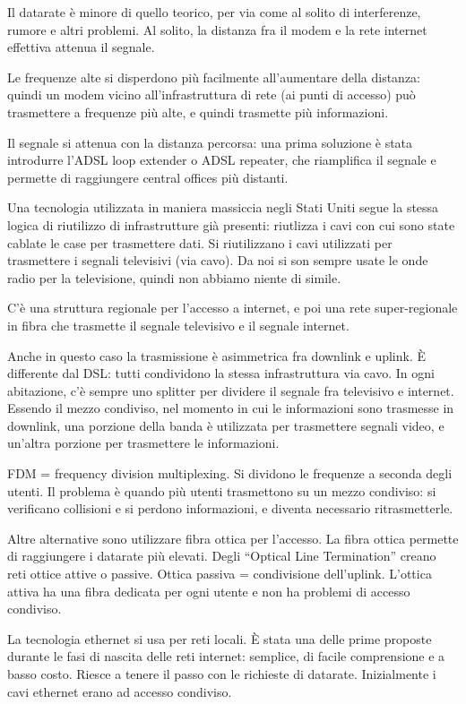 Il datarate \`e minore di quello teorico, per via come al solito di interferenze, rumore e altri problemi. Al solito, la distanza fra il modem e la rete internet effettiva attenua il segnale.

Le frequenze alte si disperdono pi\`u facilmente all'aumentare della distanza: quindi un modem vicino all'infrastruttura di rete (ai punti di accesso) pu\`o trasmettere a frequenze pi\`u alte, e quindi trasmette pi\`u informazioni.

Il segnale si attenua con la distanza percorsa: una prima soluzione \`e stata introdurre l'ADSL loop extender o ADSL repeater, che riamplifica il segnale e permette di raggiungere central offices pi\`u distanti.

Una tecnologia utilizzata in maniera massiccia negli Stati Uniti segue la stessa logica di riutilizzo di infrastrutture gi\`a presenti: riutlizza i cavi con cui sono state cablate le case per trasmettere dati. Si riutilizzano i cavi utilizzati per trasmettere i segnali televisivi (via cavo). Da noi si son sempre usate le onde radio per la televisione, quindi non abbiamo niente di simile.

C'\`e una struttura regionale per l'accesso a internet, e poi una rete super-regionale in fibra che trasmette il segnale televisivo e il segnale internet.

Anche in questo caso la trasmissione \`e asimmetrica fra downlink e uplink. \`E differente dal DSL: tutti condividono la stessa infrastruttura via cavo. In ogni abitazione, c'\`e sempre uno splitter per dividere il segnale fra televisivo e internet. Essendo il mezzo condiviso, nel momento in cui le informazioni sono trasmesse in downlink, una porzione della banda \`e utilizzata per trasmettere segnali video, e un'altra porzione per trasmettere le informazioni. 

FDM = frequency division multiplexing. Si dividono le frequenze a seconda degli utenti. Il problema \`e quando pi\`u utenti trasmettono su un mezzo condiviso: si verificano collisioni e si perdono informazioni, e diventa necessario ritrasmetterle.

Altre alternative sono utilizzare fibra ottica per l'accesso. La fibra ottica permette di raggiungere i datarate pi\`u elevati. Degli ``Optical Line Termination'' creano reti ottice attive o passive. Ottica passiva = condivisione dell'uplink. L'ottica attiva ha una fibra dedicata per ogni utente e non ha problemi di accesso condiviso.

La tecnologia ethernet si usa per reti locali. \`E stata una delle prime proposte durante le fasi di nascita delle reti internet: semplice, di facile comprensione e a basso costo. Riesce a tenere il passo con le richieste di datarate. Inizialmente i cavi ethernet erano ad accesso condiviso.

